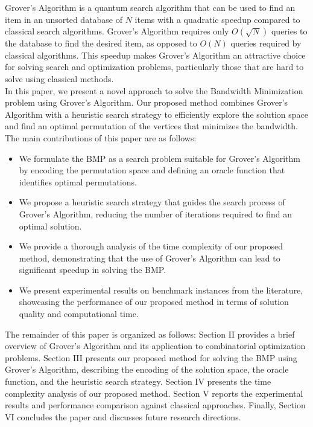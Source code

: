 Grover's Algorithm is a quantum search algorithm that can be used to find an item in an unsorted database of $N$ items with a quadratic speedup compared to classical search algorithms. Grover's Algorithm requires only $O(\sqrt{N})$ queries to the database to find the desired item, as opposed to $O(N)$ queries required by classical algorithms. This speedup makes Grover's Algorithm an attractive choice for solving search and optimization problems, particularly those that are hard to solve using classical methods. \\

In this paper, we present a novel approach to solve the Bandwidth Minimization problem using Grover's Algorithm. Our proposed method combines Grover's Algorithm with a heuristic search strategy to efficiently explore the solution space and find an optimal permutation of the vertices that minimizes the bandwidth. The main contributions of this paper are as follows:

\begin{itemize}
    \item We formulate the BMP as a search problem suitable for Grover's Algorithm by encoding the permutation space and defining an oracle function that identifies optimal permutations.
    \item We propose a heuristic search strategy that guides the search process of Grover's Algorithm, reducing the number of iterations required to find an optimal solution.
    \item We provide a thorough analysis of the time complexity of our proposed method, demonstrating that the use of Grover's Algorithm can lead to significant speedup in solving the BMP.
    \item We present experimental results on benchmark instances from the literature, showcasing the performance of our proposed method in terms of solution quality and computational time.
\end{itemize}

The remainder of this paper is organized as follows: Section II provides a brief overview of Grover's Algorithm and its application to combinatorial optimization problems. Section III presents our proposed method for solving the BMP using Grover's Algorithm, describing the encoding of the solution space, the oracle function, and the heuristic search strategy. Section IV presents the time complexity analysis of our proposed method. Section V reports the experimental results and performance comparison against classical approaches. Finally, Section VI concludes the paper and discusses future research directions.

